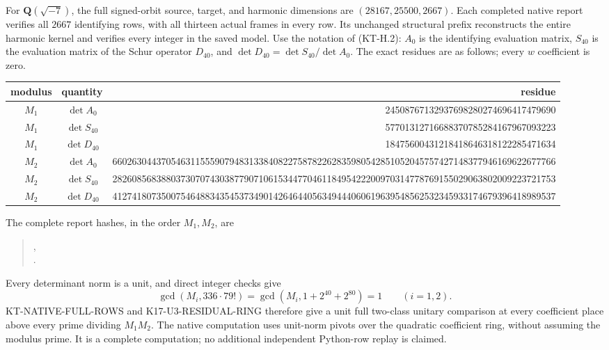 For $\mathbf Q(\sqrt{-7})$, the full signed-orbit source, target,
and harmonic dimensions are $(28167,25500,2667)$.
Each completed native report verifies all $2667$ identifying
rows, with all thirteen actual frames in every row.
Its unchanged structural prefix reconstructs the entire harmonic
kernel and verifies every integer in the saved model.
Use the notation of (KT-H.2): $A_0$ is the identifying evaluation
matrix, $S_{40}$ is the evaluation matrix of the Schur operator
$D_{40}$, and $\det D_{40}=\det S_{40}/\det A_0$.
The exact residues are as follows; every $w$ coefficient is zero.
\begin{center}\scriptsize\setlength{\tabcolsep}{0.5pt}
\begin{tabular}{c|c|r}
modulus&quantity&residue\\\hline
$M_1$&$\det A_0$&24508767132937698280274696417479690\\
$M_1$&$\det S_{40}$&57701312716688370785284167967093223\\
$M_1$&$\det D_{40}$&18475600431218418646318122285471634\\
$M_2$&$\det A_0$&6602630443705463115559079483133840822758782262835980542851052045757427148377946169622677766\\
$M_2$&$\det S_{40}$&2826085683880373070743038779071061534477046118495422200970314778769155029063802009223721753\\
$M_2$&$\det D_{40}$&4127418073500754648834354537349014264644056349444060619639548562532345933174679396418989537
\end{tabular}
\end{center}
The complete report hashes, in the order $M_1,M_2$, are
\begin{quote}\small
{},\\
.
\end{quote}
Every determinant norm is a unit, and direct integer checks give
\[
 \gcd(M_i,336\cdot79!)=
 \gcd(M_i,1+2^{40}+2^{80})=1\qquad(i=1,2).                \tag{KF40.4}
\]
KT-NATIVE-FULL-ROWS and K17-U3-RESIDUAL-RING therefore give
a unit full two-class unitary comparison at every coefficient
place above every prime dividing $M_1M_2$.
The native computation uses unit-norm pivots over the quadratic
coefficient ring, without assuming the modulus prime.
It is a complete computation; no additional independent
Python-row replay is claimed.

